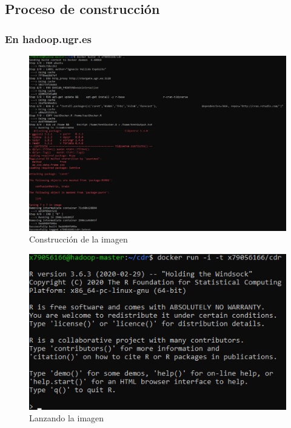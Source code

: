 \subsection{Proceso de construcción}

\subsubsection{En hadoop.ugr.es}

\begin{figure}[H]\center\includegraphics[width=.95\linewidth]{img/r/r1.png}\caption{Construcción de la imagen}\end{figure}

\begin{figure}[H]\center\includegraphics[width=.95\linewidth]{img/r/r3.png}\caption{Lanzando la imagen}\end{figure}

